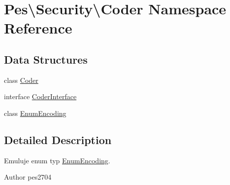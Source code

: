 \hypertarget{namespace_pes_1_1_security_1_1_coder}{}\section{Pes\textbackslash{}Security\textbackslash{}Coder Namespace Reference}
\label{namespace_pes_1_1_security_1_1_coder}
\subsection*{Data Structures}
\begin{DoxyCompactItemize}
\item 
class \mbox{\hyperlink{class_pes_1_1_security_1_1_coder_1_1_coder}{Coder}}
\item 
interface \mbox{\hyperlink{interface_pes_1_1_security_1_1_coder_1_1_coder_interface}{Coder\+Interface}}
\item 
class \mbox{\hyperlink{class_pes_1_1_security_1_1_coder_1_1_enum_encoding}{Enum\+Encoding}}
\end{DoxyCompactItemize}


\subsection{Detailed Description}
Emuluje enum typ \mbox{\hyperlink{class_pes_1_1_security_1_1_coder_1_1_enum_encoding}{Enum\+Encoding}}.

\begin{DoxyAuthor}{Author}
pes2704 
\end{DoxyAuthor}
